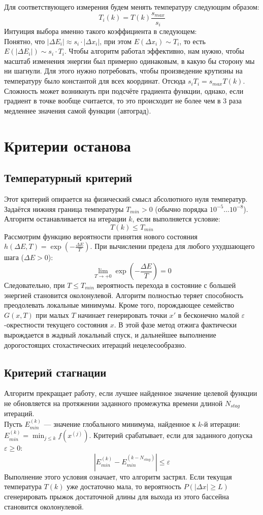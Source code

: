 \noindent Для соответствующего измерения будем менять температуру следующим образом: $$T_i(k) = T(k)\frac{s_{max}}{s_{i}}$$
\noindent Интуиция выбора именно такого коэффициента в следующем: \\
Понятно, что $|\Delta E_i| \approx s_i \cdot |\Delta x_i|$, при этом $E(\Delta x_i) \sim T_i$, то есть $E(|\Delta E_i|) \sim s_i\cdot T_i$. Чтобы алгоритм работал эффективно, нам нужно, чтобы масштаб изменения энергии был примерно одинаковым, в какую бы сторону мы ни шагнули. Для этого нужно потребовать, чтобы произведение крутизны на температуру было константой для всех координат. Отсюда $\displaystyle s_iT_i=s_{max}T(k).$ \\
\noindent Сложность может возникнуть при подсчёте градиента функции, однако, если градиент в точке вообще считается, то это происходит не более чем в 3 раза медленнее значения самой функции (автоград).
\section{Критерии останова}
\subsection{Температурный критерий}
Этот критерий опирается на физический смысл абсолютного нуля температур. Задаётся нижняя граница температуры $T_{min} > 0$ (обычно порядка $10^{-5} \dots 10^{-8}$). Алгоритм останавливается на итерации $k$, если выполняется условие:
$$T(k) \le T_{min}$$
Рассмотрим функцию вероятности принятия нового состояния $h(\Delta E, T) = \exp\left(-\frac{\Delta E}{T}\right)$.
При вычислении предела для любого ухудшающего шага ($\Delta E > 0$):
$$\lim_{T \to +0} \exp\left(-\frac{\Delta E}{T}\right) = 0$$
Следовательно, при $T \le T_{min}$ вероятность перехода в состояние с большей энергией становится околонулевой. Алгоритм полностью теряет способность преодолевать локальные минимумы. Кроме того, порождающее семейство $G(x, T)$ при малых $T$ начинает генерировать точки $x'$ в бесконечно малой $\varepsilon$-окрестности текущего состояния $x$. В этой фазе метод отжига фактически вырождается в жадный локальный спуск, и дальнейшее выполнение дорогостоящих стохастических итераций нецелесообразно.
\subsection{Критерий стагнации}
Алгоритм прекращает работу, если лучшее найденное значение целевой функции не обновляется на протяжении заданного промежутка времени длиной $N_{stag}$ итераций. \\
Пусть $E_{min}^{(k)}$ — значение глобального минимума, найденное к $k$-й итерации: $E_{min}^{(k)} = \min_{j \le k} f(x^{(j)})$.
Критерий срабатывает, если для заданного допуска $\varepsilon \ge 0$:
$$|E_{min}^{(k)} - E_{min}^{(k - N_{stag})}| \le \varepsilon$$
Выполнение этого условия означает, что алгоритм застрял. Если текущая температура $T(k)$ уже достаточно мала, то вероятность $P(| \Delta x | \ge L)$ сгенерировать прыжок достаточной длины для выхода из этого бассейна становится околонулевой. 
